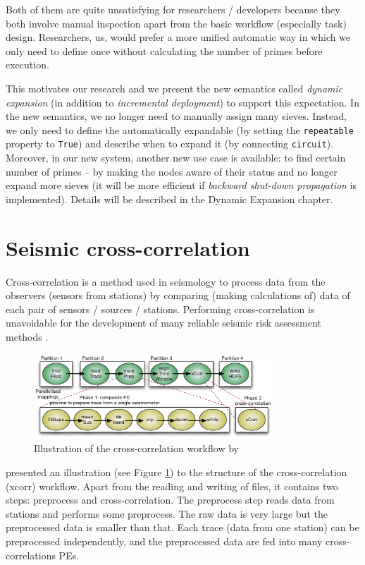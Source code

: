Both of them are quite unsatisfying for researchers / developers because they both involve manual inspection apart from the basic workflow (especially task) design. Researchers, \eg us, would prefer a more unified automatic way in which we only need to define once without calculating the number of primes before execution.

This motivates our research and we present the new semantics called \emph{dynamic expansion} (in addition to \emph{incremental deployment}) to support this expectation. In the new semantics, we no longer need to manually assign many sieves. Instead, we only need to define the \cdSieve automatically expandable (by setting the \lstinline|repeatable| property to \lstinline|True|) and describe when to expand it (by connecting \lstinline|circuit|). Moreover, in our new system, another new use case is available: to find certain number of primes -- by making the \cdSieve nodes aware of their status and no longer expand more sieves (it will be more efficient if \emph{backward shut-down propagation} is implemented). Details will be described in the Dynamic Expansion chapter.

\section{Seismic cross-correlation}
Cross-correlation is a method used in seismology to process data from the observers (\eg sensors from stations) by comparing (\ie making calculations of) data of each pair of sensors / sources / stations. Performing cross-correlation is unavoidable for the development of many reliable seismic risk assessment methods \cite{doi:10.1177/1094342016649766}.

\begin{figure}[h]
\centering
    \includegraphics[width=0.8\textwidth]{figures/wf_xcorr}
\caption{Illustration of the cross-correlation workflow by \citeauthor{doi:10.1177/1094342016649766}\cite{doi:10.1177/1094342016649766}}
\label{fig:wf_xcorr}
\end{figure}

\citeauthor{doi:10.1177/1094342016649766}\cite{doi:10.1177/1094342016649766} presented an illustration (see Figure \ref{fig:wf_xcorr}) to the structure of the cross-correlation (xcorr) workflow. Apart from the reading and writing of files, it contains two steps: preprocess and cross-correlation. The preprocess step reads data from stations and performs some preprocess. The raw data is very large but the preprocessed data is smaller than that. Each trace (data from one station) can be preprocessed independently, and the preprocessed data are fed into many cross-correlations PEs.

